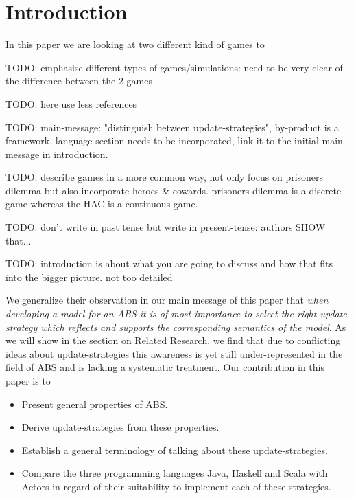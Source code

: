 \section{Introduction}
In this paper we are looking at two different kind of games to 

TODO: emphasise different types of games/simulations: need to be very clear of the difference between the 2 games

TODO: here use less references

TODO: main-message: "distinguish between update-strategies", by-product is a framework, language-section needs to be incorporated, link it to the initial main-message in introduction.

TODO: describe games in a more common way, not only focus on prisoners dilemma but also incorporate heroes \& cowards. prisoners dilemma is a discrete game whereas the HAC is a continuous game.

TODO: don't write in past tense but write in present-tense: authors SHOW that...

TODO: introduction is about what you are going to discuss and how that fits into the bigger picture. not too detailed


We generalize their observation in our main message of this paper that \textit{when developing a model for an ABS it is of most importance to select the right update-strategy which reflects and supports the corresponding semantics of the model}. As we will show in the section on Related Research, we find that due to conflicting ideas about update-strategies this awareness is yet still under-represented in the field of ABS and is lacking a systematic treatment. Our contribution in this paper is to
\begin{itemize}
	\item Present general properties of ABS.
	\item Derive update-strategies from these properties.
	\item Establish a general terminology of talking about these update-strategies.
	\item Compare the three programming languages Java, Haskell and Scala with Actors in regard of their suitability to implement each of these strategies.
\end{itemize}

